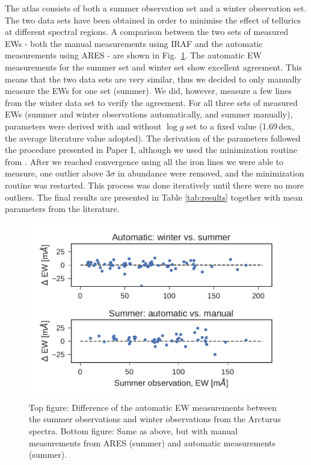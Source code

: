 \documentclass{aa}
\begin{document}
The atlas consists of both a summer observation set and a winter observation
set. The two data sets have been obtained in order to minimise the effect of
tellurics at different spectral regions. A comparison between the two sets of
measured EWs - both the manual measurements using IRAF and the automatic
measurements using ARES - are shown in Fig.~\ref{fig:EWcomp}. The automatic EW
measurements for the summer set and winter set show excellent agreement. This
means that the two data sets are very similar, thus we decided to only manually
measure the EWs for one set (summer). We did, however, measure a few lines from
the winter data set to verify the agreement. For all three sets of measured EWs
(summer and winter observations automatically, and summer manually), parameters
were derived with and without $\log g$ set to a fixed value (1.69\,dex, the
average literature value adopted). The derivation of the parameters followed the
procedure presented in Paper I, although we used the minimization routine from
\citet{Andreasen2017a}. After we reached convergence using all the iron lines we
were able to measure, one outlier above $3\sigma$ in abundance were removed, and
the minimization routine was restarted. This process was done iteratively until
there were no more outliers. The final results are presented in Table
\ref{tab:results} together with mean parameters from the literature.


\begin{figure}[htpb!]
    \centering
    \includegraphics[width=1.0\linewidth]{figures/EWcomp.pdf}
    \caption{Top figure: Difference of the automatic EW measurements between the
             summer observations and winter observations from the Arcturus
             spectra. Bottom figure: Same as above, but with manual measurements
             from ARES (summer) and automatic measurements (summer).}
    \label{fig:EWcomp}
\end{figure}
\end{document}
